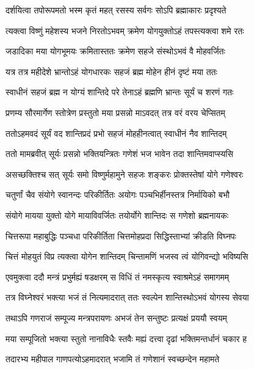 \twolineshloka
{दर्शयित्वा तपोरूपमतो भस्म कृतं महत्}
{रसस्य सर्वगः सोऽपि ब्रह्माकारः प्रदृश्यते} %

\twolineshloka
{त्यक्त्वा विष्णुं महेशस्य भजने निरतोऽभवम्}
{क्रमेण योगयुक्तोऽहं तपस्त्यक्त्वा शमे रतः} %

\twolineshloka
{जडादिका मया योगभूमयः क्रमितास्ततः}
{क्रमेण सहजे संस्थोऽभवं वै मोहवर्जितः} %

\twolineshloka
{यत्र तत्र महीदेशे भ्रान्तोऽहं योगधारकः}
{सहजं ब्रह्म मोहेन हीनं दृष्टं मया ततः} %

\twolineshloka
{स्वाधीनं सहजं ब्रह्म न योग्यं शान्तिदे परे}
{तेनाऽहं ब्रह्मणि भ्रान्तः सूर्यं च शरणं गतः} %

\twolineshloka
{प्रणम्य सौरमार्गेण स्तोत्रेण प्रस्तुतो मया}
{प्रसन्नो माऽवदत् तत्र वरं वरय चेप्सितम्} %

\twolineshloka
{ततोऽहमवदं सूर्यं वद शान्तिप्रदं प्रभो}
{सहजं मोहहीनत्वात् स्वाधीनं नैव शान्तिदम्} %

\twolineshloka
{ततो मामब्रवीत् सूर्यः प्रसन्नो भक्तियन्त्रितः}
{गणेशं भज भावेन तदा शान्तिमवाप्स्यसि} %

\twolineshloka
{असच्छक्तिश्च सत् सूर्यः समो विष्णुर्महामुने}
{सहजः शङ्करः प्रोक्तस्तेषां योगे गणेश्वरः} %

\twolineshloka
{चतुर्णां चैव संयोगे स्वानन्दः परिकीर्तितः}
{अयोगः पञ्चभिर्हीनस्तत्र निर्मायिको बभौ} %

\twolineshloka
{संयोगे मायया युक्तो योगे मायाविवर्जितः}
{तयोर्योगे शान्तिदः स गणेशो ब्रह्मनायकः} %

\twolineshloka
{चित्तरूपा महाबुद्धिः पञ्चधा परिकीर्तिता}
{चित्तमोहप्रदा सिद्धिस्ताभ्यां क्रीडति विघ्नपः} %

\twolineshloka
{चित्तं मोहयुतं विप्र त्यक्त्वा योगेन शान्तिदम्}
{चिन्तामणिं भजस्व त्वं योगिवन्द्यो भविष्यसि} %

\twolineshloka
{एवमुक्त्वा ददौ मन्त्रं प्रभुर्मह्यं षडक्षरम्}
{स विधिं तं नमस्कृत्य स्वाश्रमेऽहं समागमम्} %

\twolineshloka
{तत्र विघ्नेश्वरं भक्त्या भजं तं नित्यमादरात्}
{ततः स्वल्पेन शान्तिस्थोऽभवं योगस्य सेवया} %

\twolineshloka
{तथाऽपि गणराजं सम्पूज्य मन्त्रपरायणः}
{अभजं तेन सन्तुष्टः प्रत्यक्षं प्रययौ स्वयम्} %

\twolineshloka
{मया सम्पूजितो भक्त्या स्तुतो नानाविधैः स्तवैः}
{मह्यं दत्त्वा दृढां भक्तिमन्तर्धानं चकार ह} %

\twolineshloka
{तदारभ्य महीपाल गाणपत्योऽहमादरात्}
{भजामि तं गणेशानं स्वच्छन्देन महामते} %

